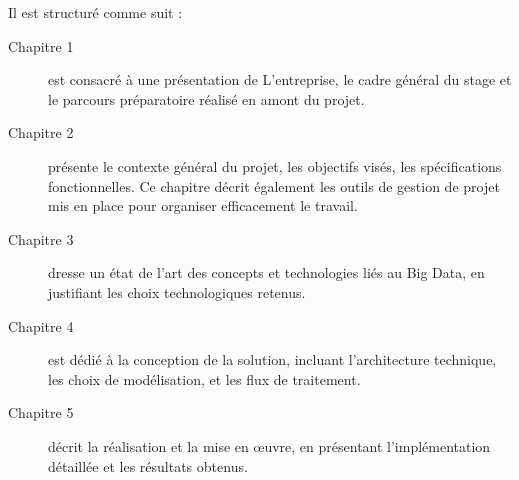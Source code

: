 Il est structuré comme suit :

\begin{description}
    \item[ Chapitre 1 ] est consacré à une présentation de L’entreprise, le cadre général du stage et le parcours préparatoire réalisé en amont du projet.
    
    \item[Chapitre 2 ] présente le contexte général du projet, les objectifs visés, les spécifications fonctionnelles. Ce chapitre décrit également les outils de gestion de projet mis en place pour organiser efficacement le travail.
    
    \item[Chapitre 3 ] dresse un état de l'art des concepts et technologies liés au Big Data, en justifiant les choix technologiques retenus.
    
    \item[Chapitre 4 ] est dédié à la conception de la solution, incluant l’architecture technique, les choix de modélisation, et les flux de traitement.
    
    \item[Chapitre 5 ] décrit la réalisation et la mise en œuvre, en présentant l'implémentation détaillée et les résultats obtenus.
\end{description}
